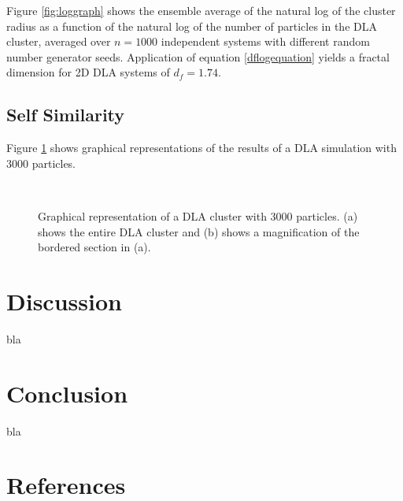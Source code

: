 \documentclass[11pt]{iopart}
\begin{document}
Figure \ref{fig:loggraph} shows the ensemble average of the natural log of the cluster radius as a function of the natural log of the number of particles in the DLA cluster, averaged over $n=1000$ independent systems with different random number generator seeds. Application of equation \ref{dflogequation} yields a fractal dimension for 2D DLA systems of $d_f = 1.74$. 

\subsection{Self Similarity}

Figure \ref{fig:selfsimilar} shows graphical representations of the results of a DLA simulation with 3000 particles.

\begin{figure}[h]
    \centering
    \quad
     \\
 
    \caption{Graphical representation of a DLA cluster with 3000 particles. (a) shows the entire DLA cluster and (b) shows a magnification of the bordered section in (a).}
    \label{fig:selfsimilar}
\end{figure}

\section{Discussion}
bla

\section{Conclusion}
bla

\section*{References}


\end{document}
